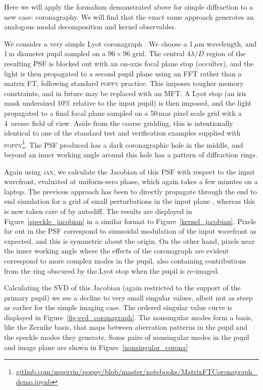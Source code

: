 \documentclass[modern]{aastex63}
\begin{document}
Here we will apply the formalism demonstrated above for simple diffraction to a new case: coronagraphy. We will find that the exact same approach generates an analogous modal decomposition and kernel observables.

We consider a very simple Lyot coronagraph \citep{lyot30}. We choose a 1\,$\mu$m wavelength, and 1\,m diameter pupil sampled on a $96\times96$ grid. The central $4 \lambda/D$ region of the resulting PSF is blocked out with an on-axis focal plane stop (occulter), and the light is then propagated to a second pupil plane using an FFT rather than a matrix FT, following standard \textsc{poppy} practice. This imposes tougher memory constraints, and in future may be replaced with an MFT. A Lyot stop (an iris mask undersized 10\% relative to the input pupil) is then imposed, and the light propagated to a final focal plane sampled on a 50\,mas pixel scale grid with a 4~arcsec field of view. Aside from the coarse gridding, this is intentionally identical to one of the standard test and verification examples supplied with \textsc{poppy}\footnote{\href{https://github.com/mperrin/poppy/blob/master/notebooks/MatrixFTCoronagraph_demo.ipynb}{github.com/mperrin/poppy/blob/master/notebooks/MatrixFTCoronagraph\_demo.ipynb}}. The PSF produced has a dark coronagraphic hole in the middle, and beyond an inner working angle around this hole has a pattern of diffraction rings.

Again using \textsc{jax}, we calculate the Jacobian of this PSF with respect to the input wavefront, evaluated at uniform-zero phase, which again takes a few minutes on a laptop. The previous approach has been to directly propagate through the end to end simulation for a grid of small perturbations in the input plane \citep{falco}, whereas this is now taken care of by autodiff. The results are displayed in Figure~\ref{speckle_jacobian} in a similar format to Figure~\ref{kernel_jacobian}. Pixels far out in the PSF correspond to sinusoidal modulation of the input wavefront as expected, and this is symmetric about the origin. On the other hand, pixels near the inner working angle where the effects of the coronagraph are evident correspond to more complex modes in the pupil, also containing contributions from the ring obscured by the Lyot stop when the pupil is re-imaged. 

Calculating the SVD of this Jacobian (again restricted to the support of the primary pupil) we see a decline to very small singular values, albeit not as steep as earlier for the simple imaging case. The ordered singular value curve is displayed in Figure~\ref{fig:svd_coronagraph}. The nonsingular modes form a basis, like the Zernike basis, that maps between aberration patterns in the pupil and the speckle modes they generate. Some pairs of nonsingular modes in the pupil and image plane are shown in Figure~\ref{nonsingular_corona}
\end{document}
